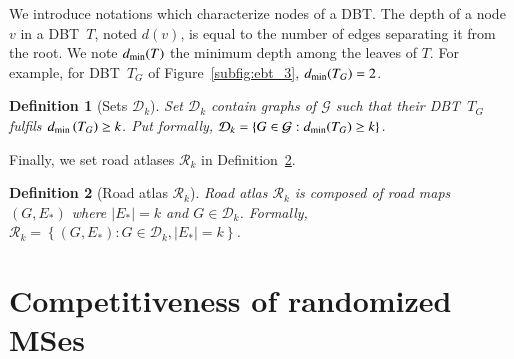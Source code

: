 \documentclass[preprint]{elsarticle}
\newtheorem{definition}{Definition}
\newcommand{\set}[1]{\left\{ #1 \right\}}
\newcommand{\card}[1]{\left| #1 \right|}
\newcommand{\mcalg}{\mathcal{G}}
\newcommand{\mcalr}{\mathcal{R}}
\newcommand{\mcald}{\mathcal{D}}
\newcommand{\mts}{MS}
\newcommand{\ebt}{DBT}
\newcommand{\dmin}{d_{\mbox{\scriptsize{min}}}}
\begin{document}

We introduce notations which characterize nodes of a \ebt . 
The depth of a node $v$ in a \ebt ~$T$, noted $d(v)$, is equal to the number of edges separating it from the root.
We note $\dmin(T)$ the minimum depth among the leaves of $T$. For example, for \ebt ~$T_G$ of Figure~\ref{subfig:ebt_3}, $\dmin(T_G) = 2$. 

\begin{definition}[Sets $\mcald_k$]
Set $\mcald_k$ contain graphs of $\mcalg$ such that their \ebt ~$T_G$ fulfils $\dmin\left(T_G\right) \geq k$. Put formally, $\mcald_k = \set{G \in \mcalg : \dmin(T_G) \geq k}$. 
\end{definition}

Finally, we set road atlases $\mcalr_k$ in Definition~\ref{def:roadatlas}.

\begin{definition}[Road atlas $\mcalr_k$]
Road atlas $\mcalr_k$ is composed of road maps $\left(G,E_*\right)$ where $\card{E_*} = k$ and $G \in \mcald_k$. Formally, $\mcalr_k = \set{\left(G ,E_*\right): G \in \mcald_k, \card{E_*} = k}$.
\label{def:roadatlas}
\end{definition}


\section{Competitiveness of randomized \mts es} \label{sec:competitiveness}
\end{document}
